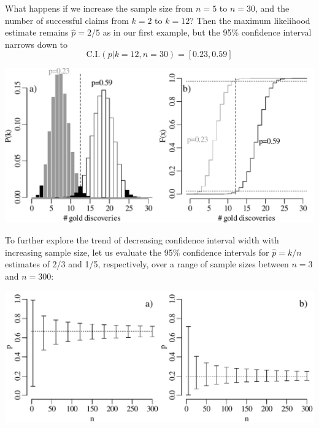 What happens if we increase the sample size from $n=5$ to $n=30$, and
the number of successful claims from $k=2$ to $k=12$?  Then the
maximum likelihood estimate remains $\hat{p}=2/5$ as in our first
example, but the 95\% confidence interval narrows down to
\[
\mbox{C.I.}(p|k=12,n=30) = [0.23, 0.59]
\]

\noindent\begin{minipage}[t][][b]{.65\textwidth}
\includegraphics[]{../figures/binomcik12n30.pdf}
\medskip
\end{minipage}
\begin{minipage}[t][][t]{.35\textwidth}
  \label{fig:binomcik12n30}
\end{minipage}

To further explore the trend of decreasing confidence interval width
with increasing sample size, let us evaluate the 95\% confidence
intervals for $\hat{p}=k/n$ estimates of 2/3 and 1/5, respectively,
over a range of sample sizes between $n=3$ and $n=300$:\medskip

\noindent\begin{minipage}[t][][b]{.65\textwidth}
\includegraphics[]{../figures/binomcivsn.pdf}
\medskip
\end{minipage}
\begin{minipage}[t][][t]{.35\textwidth}
  \label{fig:binomcivsn}
\end{minipage}

